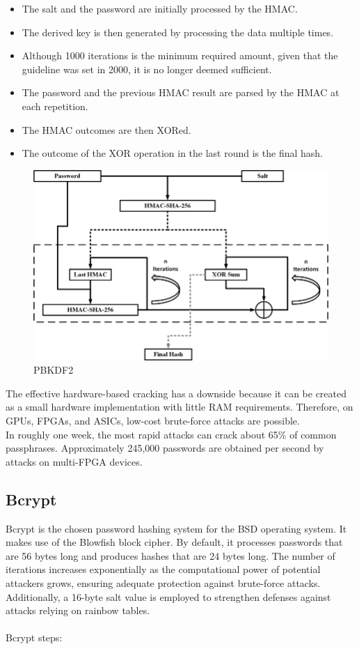 \documentclass[10pt,oneside,english,a4paper]{article}
\begin{document}
\begin{itemize}
\item The salt and the password are initially processed by the HMAC. 
\item The derived key is then generated by processing the data multiple times.
\item Although 1000 iterations is the minimum required amount, given that the guideline was set in 2000, it is no longer deemed sufficient. 
\item The password and the previous HMAC result are parsed by the HMAC at each repetition.  
\item The HMAC outcomes are then XORed.
\item The outcome of the XOR operation in the last round is the final hash.
\end{itemize}

\begin{figure}[h!]
	\centering
	\includegraphics[scale = 0.40]{PBKDF2.png}
	\caption{PBKDF2}
	\label{}
\end{figure}

The effective hardware-based cracking has a downside because it can be created as a small hardware implementation with little RAM requirements. Therefore, on GPUs, FPGAs, and ASICs, low-cost brute-force attacks are possible. \\
In roughly one week, the most rapid attacks can crack about 65\% of common passphrases. Approximately 245,000 passwords are obtained per second by attacks on multi-FPGA devices.

\subsection{Bcrypt}
Bcrypt is the chosen password hashing system for the BSD operating system. It makes use of the Blowfish block cipher. By default, it processes passwords that are 56 bytes long and produces hashes that are 24 bytes long. The number of iterations increases exponentially as the computational power of potential attackers grows, ensuring adequate protection against brute-force attacks. Additionally, a 16-byte salt value is employed to strengthen defenses against attacks relying on rainbow tables. 
\\\\
Bcrypt steps:
\end{document}
